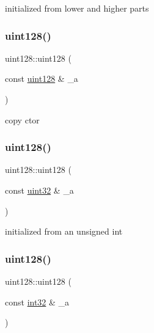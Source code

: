 initialized from lower and higher parts 

\mbox{\label{classuint128_a228d418fd9f623a4ee7120a7a53e0797}} 
\subsubsection{\texorpdfstring{uint128()}{uint128()}\hspace{0.1cm}{\footnotesize\ttfamily [3/6]}}
{\footnotesize\ttfamily uint128\+::uint128 (\begin{DoxyParamCaption}\item[{const \hyperlink{classuint128}{uint128} \&}]{\+\_\+a }\end{DoxyParamCaption})\hspace{0.3cm}{\ttfamily [inline]}}



copy ctor 

\mbox{\label{classuint128_a5820b53a7880e5caf28057ea8bddff4b}} 
\subsubsection{\texorpdfstring{uint128()}{uint128()}\hspace{0.1cm}{\footnotesize\ttfamily [4/6]}}
{\footnotesize\ttfamily uint128\+::uint128 (\begin{DoxyParamCaption}\item[{const \hyperlink{types_8h_a8f95e75e58492e87412191fabadd8ca8}{uint32} \&}]{\+\_\+a }\end{DoxyParamCaption})\hspace{0.3cm}{\ttfamily [inline]}}



initialized from an unsigned int 

\mbox{\label{classuint128_af1cf2b32a813dae00ec27cfae5fabf1a}} 
\subsubsection{\texorpdfstring{uint128()}{uint128()}\hspace{0.1cm}{\footnotesize\ttfamily [5/6]}}
{\footnotesize\ttfamily uint128\+::uint128 (\begin{DoxyParamCaption}\item[{const \hyperlink{types_8h_a3d594eb72953c94a18a03d929ebd9167}{int32} \&}]{\+\_\+a }\end{DoxyParamCaption})\hspace{0.3cm}{\ttfamily [inline]}}



